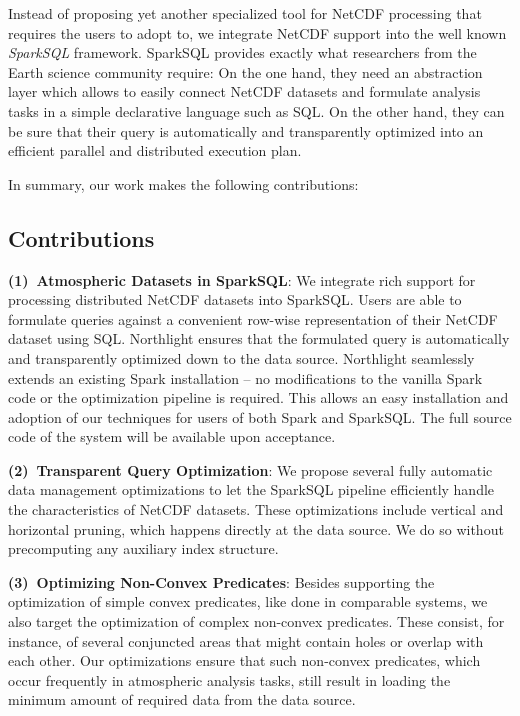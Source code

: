 \documentclass[conference]{IEEEtran}
\newcommand{\system}{Northlight}
\begin{document}
Instead of proposing yet another specialized tool for NetCDF processing that requires the users to adopt to, we integrate NetCDF support into the well known \textit{SparkSQL}\cite{lit:spark-sql,lit:spark-sql-diss} framework. SparkSQL provides exactly what researchers from the Earth science community require: On the one hand, they need an abstraction layer which allows to easily connect NetCDF datasets and formulate analysis tasks in a simple declarative language such as SQL. On the other hand, they can be sure that their query is automatically and transparently optimized into an efficient parallel and distributed execution plan. 

In summary, our work makes the following contributions:

\subsection{Contributions}

\textbf{(1)~Atmospheric Datasets in SparkSQL}: We integrate rich support for processing distributed NetCDF datasets into SparkSQL. Users are able to formulate queries against a convenient row-wise representation of their NetCDF dataset using SQL. \system{} ensures that the formulated query is automatically and transparently optimized down to the data source. \system{} seamlessly extends an existing Spark\cite{lit:spark,lit:spark-diss} installation -- no modifications to the vanilla Spark code or the optimization pipeline is required. This allows an easy installation and adoption of our techniques for users of both Spark and SparkSQL. The full source code of the system will be available upon acceptance. 

\noindent \textbf{(2)~Transparent Query Optimization}: We propose several fully automatic data management optimizations to let the SparkSQL pipeline efficiently handle the characteristics of NetCDF datasets. These optimizations include vertical and horizontal pruning, which happens directly at the data source. We do so without precomputing any auxiliary index structure. 

\noindent \textbf{(3)~Optimizing Non-Convex Predicates}: Besides supporting the optimization of simple convex predicates, like done in comparable systems, we also target the optimization of complex non-convex predicates. These consist, for instance, of several conjuncted areas that might contain holes or overlap with each other. Our optimizations ensure that such non-convex predicates, which occur frequently in atmospheric analysis tasks, still result in loading the minimum amount of required data from the data source.
\end{document}
